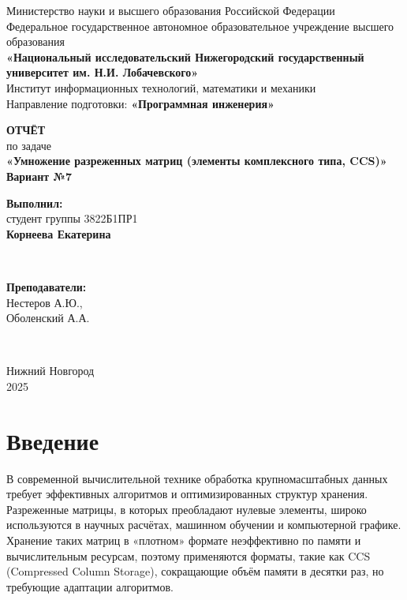 \documentclass[12pt]{extarticle}
\begin{document}
\begin{titlepage}
    \centering
    \large
    Министерство науки и высшего образования Российской Федерации\\
    Федеральное государственное автономное образовательное учреждение высшего образования\\
    \textbf{«Национальный исследовательский Нижегородский государственный университет им. Н.И. Лобачевского»}\\[0.25cm]
    Институт информационных технологий, математики и механики\\
    Направление подготовки: \textbf{«Программная инженерия»}\\[1cm]
    
    \vfill
    
    {\LARGE \textbf{ОТЧЁТ}}\\
    {\Large по задаче}\\
    {\LARGE \textbf{«Умножение разреженных матриц (элементы комплексного типа, CCS)»}}\\
    {\Large \textbf{Вариант №7}}\\
    
    \vfill
    
    \hfill\parbox{0.4\textwidth}{
        \textbf{Выполнил:} \\
        студент группы 3822Б1ПР1 \\
        \textbf{Корнеева Екатерина}
    }\\[0.5cm]
    
    \hfill\parbox{0.4\textwidth}{
        \textbf{Преподаватели:} \\
        Нестеров А.Ю.,\\
        Оболенский А.А.
    }\\[0.5cm]
    
    \vfill
    
    Нижний Новгород\\
    2025
\end{titlepage}


\thispagestyle{empty}
\clearpage
{} 
\setcounter{page}{2} 
\tableofcontents
\clearpage
\setcounter{page}{3} 
\section{Введение}
\hspace*{1.25cm}В современной вычислительной технике обработка крупномасштабных данных требует эффективных алгоритмов и оптимизированных структур хранения. Разреженные матрицы, в которых преобладают нулевые элементы, широко используются в научных расчётах, машинном обучении и компьютерной графике. Хранение таких матриц в «плотном» формате неэффективно по памяти и вычислительным ресурсам, поэтому применяются форматы, такие как CCS (Compressed Column Storage), сокращающие объём памяти в десятки раз, но требующие адаптации алгоритмов.
\end{document}
